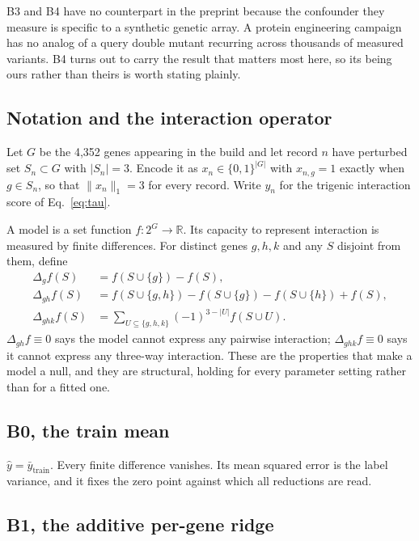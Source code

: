 B3 and B4 have no counterpart in the preprint because the confounder they measure
is specific to a synthetic genetic array. A protein engineering campaign has no
analog of a query double mutant recurring across thousands of measured
variants. B4 turns out to carry the result that matters most here, so its being
ours rather than theirs is worth stating plainly.

\subsection{Notation and the interaction operator}

Let $G$ be the 4{,}352 genes appearing in the build and let record $n$ have
perturbed set $S_n \subset G$ with $|S_n| = 3$. Encode it as
$x_n \in \{0,1\}^{|G|}$ with $x_{n,g} = 1$ exactly when $g \in S_n$, so that
$\lVert x_n \rVert_1 = 3$ for every record. Write $y_n$ for the trigenic
interaction score of Eq.~\ref{eq:tau}.

A model is a set function $f : 2^{G} \to \mathbb{R}$. Its capacity to represent
interaction is measured by finite differences. For distinct genes $g, h, k$ and
any $S$ disjoint from them, define
%
\begin{align}
  \Delta_g f(S) &= f(S \cup \{g\}) - f(S), \\
  \Delta_{gh} f(S) &= f(S \cup \{g,h\}) - f(S \cup \{g\}) - f(S \cup \{h\}) + f(S),
  \label{eq:delta2}\\
  \Delta_{ghk} f(S) &= \sum_{U \subseteq \{g,h,k\}} (-1)^{3-|U|} f(S \cup U).
  \label{eq:delta3}
\end{align}
%
$\Delta_{gh} f \equiv 0$ says the model cannot express any pairwise interaction;
$\Delta_{ghk} f \equiv 0$ says it cannot express any three-way interaction. These
are the properties that make a model a null, and they are structural, holding for
every parameter setting rather than for a fitted one.

\subsection{B0, the train mean}

$\hat{y} = \bar{y}_{\mathrm{train}}$. Every finite difference vanishes. Its mean
squared error is the label variance, and it fixes the zero point against which
all reductions are read.

\subsection{B1, the additive per-gene ridge}

